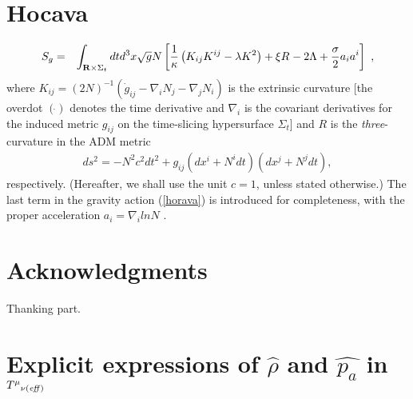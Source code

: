 \documentclass[preprint,aps,tightenlines,showkeys,nofootinbib,superscriptaddress]{revtex4}
\newcommand{\eq}{eqnarray}
\newcommand{\La}{{\Lambda}}
\newcommand{\m}{{\mu}}
\newcommand{\n}{{\nu}}
\newcommand{\Si}{{\Sigma}}
\newcommand{\f}{\frac}
\begin{document}
\section{Hocava}

\begin{\eq}
  S_g &= & \int_{{\bf R} \times \Si_t} dt d^3 x
  \sqrt{g}N\left[\frac{1}{\kappa}\left(K_{ij}K^{ij}-\lambda
  K^2\right)+\xi R^{}-2 \La+\f{\sigma}{2} a_i a^i \right]\ ,
  \label{horava}
\end{\eq}
where
$
K_{ij}=({2N})^{-1}\left(\dot{g}_{ij}-\nabla_i
N_j-\nabla_jN_i\right)
$
is the extrinsic curvature [the overdot $(\dot{})$ denotes the time
  derivative and $\nabla_i$ is the covariant derivatives for the
induced metric $g_{ij}$ on the time-slicing hypersurface $\Si_t$] and
$R$ is the {\it three}-curvature in the ADM metric
\begin{\eq}
  \label{metric}
  ds^2=-N^2 c^2 dt^2+g_{ij}\left(dx^i+N^i dt\right)\left(dx^j+N^j
  dt\right),
\end{\eq}
respectively. (Hereafter, we shall use the unit $c=1$, unless stated otherwise.)
The last term in the gravity action (\ref{horava}) is introduced for
completeness, with the proper acceleration $a_i=\nabla_i ln N$ \cite{Blas:2009}.

\section*{Acknowledgments}

Thanking part.

\appendix

\section{Explicit expressions of $\widehat{\rho}$ and $\widehat{p_a}$ in
  ${T^{\m}}_{\n (\it{eff})}$
}

\newcommand{\J}[4]{#1 {\bf #2} #3 (#4)}
\newcommand{\andJ}[3]{{\bf #1} (#2) #3}
\newcommand{\AP}{Ann. Phys. (N.Y.)}
\newcommand{\MPL}{Mod. Phys. Lett.}
\newcommand{\NP}{Nucl. Phys.}
\newcommand{\PL}{Phys. Lett.}
\newcommand{\PR}{Phys. Rev. D}
\newcommand{\PRL}{Phys. Rev. Lett.}
\newcommand{\PTP}{Prog. Theor. Phys.}
\newcommand{\hep}[1]{ hep-th/{#1}}
\newcommand{\hepp}[1]{ hep-ph/{#1}}
\newcommand{\hepg}[1]{ gr-qc/{#1}}
\newcommand{\bi}{ \bibitem}
\end{document}
